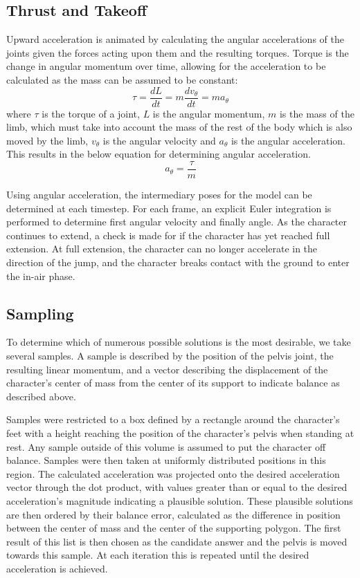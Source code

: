 \subsection{Thrust and Takeoff}
Upward acceleration is animated by calculating the angular accelerations of the joints given the forces acting upon them and the resulting torques.  Torque is the change in angular momentum over time, allowing for the acceleration to be calculated as the mass can be assumed to be constant: \[\tau = \dfrac{dL}{dt} = m \dfrac{dv_{\theta}}{dt} = m a_{\theta}\] where $\tau$ is the torque of a joint, $L$ is the angular momentum, $m$ is the mass of the limb, which must take into account the mass of the rest of the body which is also moved by the limb, $v_{\theta}$ is the angular velocity and $a_{\theta}$ is the angular acceleration. This results in the below equation for determining angular acceleration. \[a_{\theta} = \dfrac{\tau}{m}\]

Using angular acceleration, the intermediary poses for the model can be determined at each timestep.   For each frame, an explicit Euler integration is performed to determine first angular velocity and finally angle.  As the character continues to extend, a check is made for if the character has yet reached full extension.  At full extension, the character can no longer accelerate in the direction of the jump, and the character breaks contact with the ground to enter the in-air phase.

\subsection{Sampling}
To determine which of numerous possible solutions is the most desirable, we take several samples.  A sample is described by the position of the pelvis joint, the resulting linear momentum, and a vector describing the displacement of the character's center of mass from the center of its support to indicate balance as described above.

Samples were restricted to a box defined by a rectangle around the character's feet with a height reaching the position of the character's pelvis when standing at rest.  Any sample outside of this volume is assumed to put the character off balance.  Samples were then taken at uniformly distributed positions in this region.  The calculated acceleration was projected onto the desired acceleration vector through the dot product, with values greater than or equal to the desired acceleration's magnitude indicating a plausible solution.  These plausible solutions are then ordered by their balance error, calculated as the difference in position between the center of mass and the center of the supporting polygon.  The first result of this list is then chosen as the candidate answer and the pelvis is moved towards this sample.  At each iteration this is repeated until the desired acceleration is achieved.

